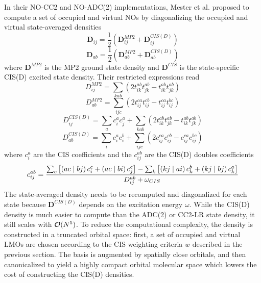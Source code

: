 In their NO-CC2 and NO-ADC(2) implementations, Mester et al. \cite{Mes2017, Mes2018, Mes2019} proposed to compute a set of occupied and virtual NOs by diagonalizing the occupied and virtual state-averaged densities
\begin{equation}
\mathbf{D}_{ij} = \frac{1}{2} \left( \mathbf{D}_{ij}^{MP2} + \mathbf{D}_{ij}^{CIS(D)} \right)
\end{equation}
\begin{equation}
\mathbf{D}_{ab} = \frac{1}{2} \left( \mathbf{D}_{ab}^{MP2} + \mathbf{D}_{ab}^{CIS(D)} \right)
\end{equation}
\noindent where $\mathbf{D}^{MP2}$ is the MP2 ground state density and $\mathbf{D}^{CIS}$ is the state-specific CIS(D) excited state density. Their restricted expressions read
\begin{equation}
D_{ij}^{MP2} = \sum_{kab} \left( 2 t_{ik}^{ab} t_{jk}^{ab} - t_{ik}^{ab} t_{jk}^{ab} \right) 
\end{equation}
\begin{equation}
D_{ab}^{MP2} = \sum_{ijc} \left( 2t_{ij}^{ca} t_{ij}^{cb} - t_{ij}^{ca}t_{ij}^{bc} \right)
\end{equation}
\begin{equation}
D_{ij}^{CIS(D)} = \sum_{a} c_i^a c_j^a  + \sum_{kab} \left( 2 t_{ik}^{ab} t_{jk}^{ab} - t_{ik}^{ab} t_{jk}^{ab} \right) 
\end{equation}
\begin{equation}
D_{ab}^{CIS(D)} = \sum_{i} c_i^a c_i^b + \sum_{ijc} \left( 2c_{ij}^{ca} c_{ij}^{cb} - c_{ij}^{ca}c_{ij}^{bc} \right)
\end{equation}
\noindent where $c_i^a$ are the CIS coefficients and the $c_{ij}^{ab}$ are the CIS(D) doubles coefficients
\begin{equation}
c_{ij}^{ab} = \frac{\sum_c \left[ \left( ac \mid bj \right) c_i^c + \left( ac \mid bi \right) c_j^c \right] - \sum_k \left[ \left( kj \mid ai \right) c_k^b + \left( kj \mid bj \right) c_k^a \right]}{D_{ij}^{ab} + \omega_{CIS}}
\end{equation}
\noindent The state-averaged density needs to be recomputed and diagonalized for each state because $\mathbf{D}^{CIS(D)}$ depends on the excitation energy $\omega$. While the CIS(D) density is much easier to compute than the ADC(2) or CC2-LR state density, it still scales with $\mathcal{O}(N^{5})$. To reduce the computational complexity, the density is constructed in a truncated orbital space: first, a set of occupied and virtual LMOs are chosen according to the CIS weighting criteria $w$ described in the previous section. The basis is augmented by spatially close orbitals, and then canonicalized to yield a highly compact orbital molecular space which lowers the cost of constructing the CIS(D) densities. 

